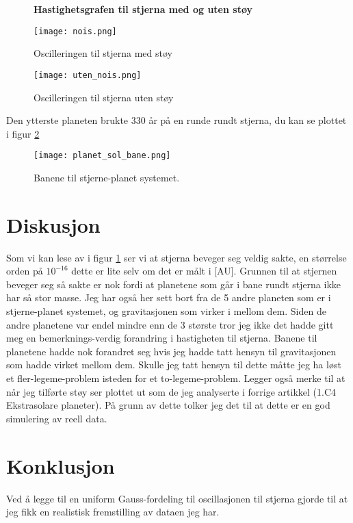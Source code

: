 \documentclass[12pt,preprint]{aastex6}
\begin{document}
\begin{figure}[h]
\begin{center}
\textbf{Hastighetsgrafen til stjerna med og uten støy}\par\medskip
\end{center}
\begin{minipage}[b]{0.45\linewidth}
\centering
\texttt{[image: nois.png]}
\caption{Oscilleringen til stjerna med støy}
\label{2}
\end{minipage}
\hspace{0.5cm}
\begin{minipage}[b]{0.45\linewidth}
\centering
\texttt{[image: uten\_nois.png]}
\caption{Oscilleringen til stjerna uten støy}
\label{3}
\end{minipage}
\end{figure}

Den ytterste planeten brukte 330 år på en runde rundt stjerna, du kan se plottet i figur \ref{4}

\begin{figure}
\centering
\texttt{[image: planet\_sol\_bane.png]}
\caption{Banene til stjerne-planet systemet.}
\label{4}
\end{figure}

\section{Diskusjon}
Som vi kan lese av i figur \ref{3} ser vi at stjerna beveger seg veldig sakte, en størrelse orden på $10^{-16}$ dette er lite selv om det er målt i [AU]. Grunnen til at stjernen beveger seg så sakte er nok fordi at planetene som går i bane rundt stjerna ikke har så stor masse. Jeg har også her sett bort fra de 5 andre planeten som er i stjerne-planet systemet, og gravitasjonen som virker i mellom dem. Siden de andre planetene var endel mindre enn de 3 største tror jeg ikke det hadde gitt meg en bemerknings-verdig forandring i hastigheten til stjerna. Banene til planetene hadde nok forandret seg hvis jeg hadde tatt hensyn til gravitasjonen som hadde virket mellom dem. Skulle jeg tatt hensyn til dette måtte jeg ha løst et fler-legeme-problem isteden for et to-legeme-problem. 
Legger også merke til at når jeg tilførte støy ser plottet ut som de jeg analyserte i forrige artikkel (1.C4 Ekstrasolare planeter). På grunn av dette tolker jeg det til at dette er en god simulering av reell data. 

\section{Konklusjon}
Ved å legge til en uniform Gauss-fordeling til oscillasjonen til stjerna gjorde til at jeg fikk en realistisk fremstilling av dataen jeg har. 
\end{document}
